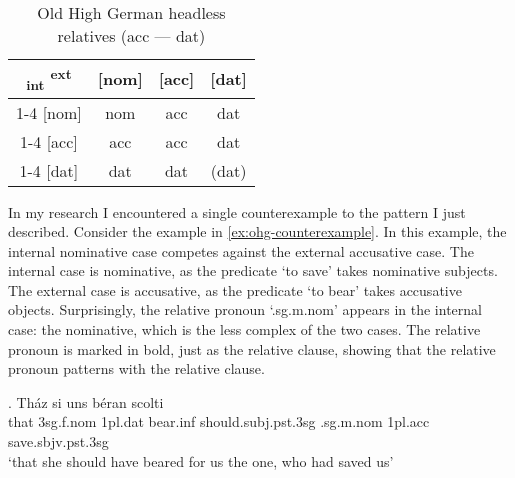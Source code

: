 \begin{table}[ht]
  \center
  \caption{Old High German headless relatives (\ac{acc} --- \ac{dat})}
  \begin{tabular}{c|c|c|c}
    \toprule
        \textsubscript{\ac{int}} \textsuperscript{\ac{ext}}
          & [\ac{nom}]
          & [\ac{acc}]
          & [\ac{dat}]
          \\ \cmidrule{1-4}
      [\ac{nom}]
          & \ac{nom}
          & \ac{acc}
          & \ac{dat}
          \\ \cmidrule{1-4}
      [\ac{acc}]
          & \ac{acc}
          & \ac{acc}
          & \cellcolor{DG}\ac{dat}
          \\ \cmidrule{1-4}
      [\ac{dat}]
          & \ac{dat}
          & \cellcolor{LG}\ac{dat}
          & (\ac{dat})
          \\
    \bottomrule
  \end{tabular}
    \label{tbl:summary-old-high-german-acc-dat}
\end{table}

In my research I encountered a single counterexample to the pattern I just described.
Consider the example in \ref{ex:ohg-counterexample}. In this example, the internal nominative case competes against the external accusative case.
The internal case is nominative, as the predicate  `to save' takes nominative subjects.
The external case is accusative, as the predicate  `to bear' takes accusative objects.
Surprisingly, the relative pronoun  `.\ac{sg}.\ac{m}.\ac{nom}' appears in the internal case: the nominative, which is the less complex of the two cases. The relative pronoun is marked in bold, just as the relative clause, showing that the relative pronoun patterns with the relative clause.

\exg. Tház si uns béran scolti   \\
 that 3\ac{sg}.\ac{f}.\ac{nom} 1\ac{pl}.\ac{dat} bear.\ac{inf}\scsub{[acc]} should.\ac{subj}.\ac{pst}.3\ac{sg} .\ac{sg}.\ac{m}.\ac{nom} 1\ac{pl}.\ac{acc} save.\ac{sbjv}.\ac{pst}.3\ac{sg}\scsub{[nom]}\\
 `that she should have beared for us the one, who had saved us' \label{ex:ohg-counterexample}


